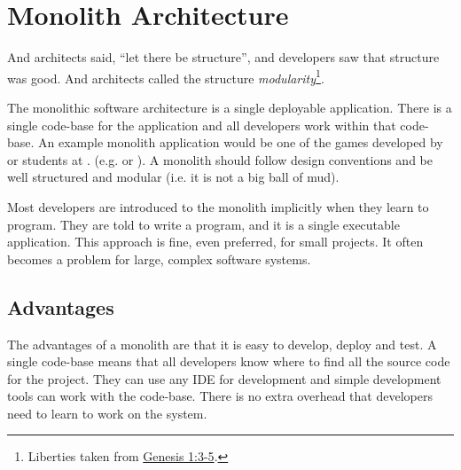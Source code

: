 \section{Monolith Architecture}

\noindent
And architects said, ``let there be structure'', and developers saw that structure was good.
And architects called the structure \emph{modularity}\footnote{Liberties taken from
\href{https://www.biblegateway.com/passage/?search=gen+1\&version=ESV}{Genesis 1:3-5}.}.

The monolithic software architecture is a single deployable application.
There is a single code-base for the application and all developers work within that code-base.
An example monolith application would be one of the games developed by 
or 
students at .
(e.g. 
or ).
A monolith should follow design conventions and be well structured and modular
(i.e. it is not a big ball of mud).

Most developers are introduced to the monolith implicitly when they learn to program.
They are told to write a program, and it is a single executable application.
This approach is fine, even preferred, for small projects.
It often becomes a problem for large, complex software systems.

\subsection{Advantages}

The advantages of a monolith are that it is easy to develop, deploy and test.
A single code-base means that all developers know where to find all the source code for the project.
They can use any IDE for development and simple development tools can work with the code-base.
There is no extra overhead that developers need to learn to work on the system.

